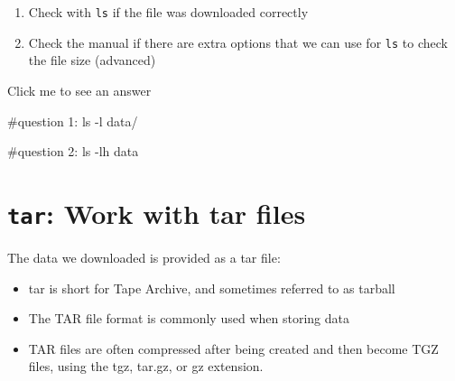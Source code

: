 \documentclass[
  letterpaper,
  DIV=11,
  numbers=noendperiod]{scrreprt}
\newenvironment{Shaded}{}{}
\newcommand{\AttributeTok}[1]{\textcolor[rgb]{0.84,0.23,0.29}{#1}}
\newcommand{\CommentTok}[1]{\textcolor[rgb]{0.42,0.45,0.49}{#1}}
\newcommand{\FunctionTok}[1]{\textcolor[rgb]{0.44,0.26,0.76}{#1}}
\newcommand{\NormalTok}[1]{\textcolor[rgb]{0.14,0.16,0.18}{#1}}
\providecommand{\tightlist}{%
  \setlength{\itemsep}{0pt}\setlength{\parskip}{0pt}}\usepackage{longtable,booktabs,array}
\begin{document}
\begin{tcolorbox}[enhanced jigsaw, colframe=quarto-callout-caution-color-frame, colbacktitle=quarto-callout-caution-color!10!white, opacitybacktitle=0.6, breakable, titlerule=0mm, colback=white, toptitle=1mm, leftrule=.75mm, opacityback=0, coltitle=black, left=2mm, toprule=.15mm, bottomtitle=1mm, rightrule=.15mm, title=\textcolor{quarto-callout-caution-color}{\faFire}\hspace{0.5em}{Exercise}, bottomrule=.15mm, arc=.35mm]

\begin{enumerate}
\def\labelenumi{\arabic{enumi}.}
\tightlist
\item
  Check with \texttt{ls} if the file was downloaded correctly
\item
  Check the manual if there are extra options that we can use for
  \texttt{ls} to check the file size (advanced)
\end{enumerate}

Click me to see an answer

\begin{Shaded}
\begin{Highlighting}[]
\CommentTok{\#question 1:}
\FunctionTok{ls} \AttributeTok{{-}l}\NormalTok{ data/}

\CommentTok{\#question 2:}
\FunctionTok{ls} \AttributeTok{{-}lh}\NormalTok{ data}
\end{Highlighting}
\end{Shaded}

\end{tcolorbox}

\section{\texorpdfstring{\texttt{tar}: Work with tar
files}{tar: Work with tar files}}\label{tar-work-with-tar-files}

The data we downloaded is provided as a tar file:

\begin{itemize}
\tightlist
\item
  tar is short for Tape Archive, and sometimes referred to as tarball
\item
  The TAR file format is commonly used when storing data
\item
  TAR files are often compressed after being created and then become TGZ
  files, using the tgz, tar.gz, or gz extension.
\end{itemize}
\end{document}

